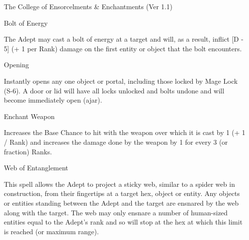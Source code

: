 \begin{Chapter}{The College of Ensorcelments \& Enchantments (Ver 1.1)}
\begin{spell}[S-2]{Bolt of Energy}

\begin{effects}
The Adept may cast a bolt of energy at a target and will, as a result,
inflict [D - 5] (+ 1 per Rank) damage on the first entity or object
that the bolt encounters.
\end{effects}
\end{spell}

\begin{spell}[S-3]{Opening}

\begin{effects}
Instantly opens any one object or portal, including those locked by
Mage Lock (S-6).  A door or lid will have all locks unlocked and bolts
undone and will become immediately open (ajar).
\end{effects}
\end{spell}

\begin{spell}[S-4]{Enchant Weapon}

\begin{effects}
Increases the Base Chance to hit with the weapon over which it is cast
by 1 (+ 1 / Rank) and increases the damage done by the weapon by 1 for
every 3 (or fraction) Ranks.
\end{effects}
\end{spell}

\begin{spell}[S-5]{Web of Entanglement}

\begin{effects}
This spell allows the Adept to project a sticky web, similar to a
spider web in construction, from their fingertips at a target hex,
object or entity.  Any objects or entities standing between the Adept
and the target are ensnared by the web along with the target. The web
may only ensnare a number of human-sized entities equal to the Adept’s
rank and so will stop at the hex at which this limit is reached (or
maximum range).


\end{effects}
\end{spell}
\end{Chapter}
